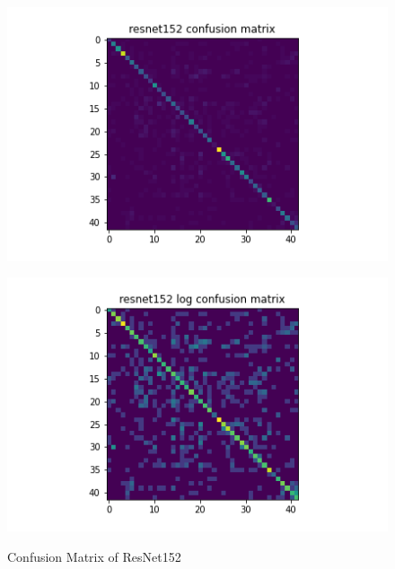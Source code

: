 \begin{figure}[t]
\begin{minipage}[b]{.5\linewidth}
    {\includegraphics[width=1.2\textwidth]{figs/conf_matrix/resnet152_conf.png}}
  \end{minipage}
  \hfill
  \begin{minipage}[b]{.5\linewidth}
    \centering

    {\includegraphics[width=1.2\textwidth]{figs/conf_matrix/resnet152_log_conf.png}}
  \end{minipage}

  \caption{Confusion Matrix of ResNet152}
  \label{fig:resnet152_conf}
  \vspace{0.2in}
\end{figure}

